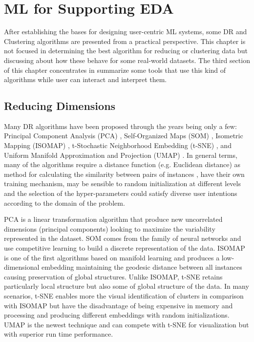 \chapter{ML for Supporting EDA}
\label{chapter3}

\graphicspath{{Chapter3/figs/}}

After establishing the bases for designing user-centric ML systems, some DR and Clustering algorithms are presented from a practical perspective. This chapter is not focused in determining the best algorithm for reducing or clustering data but discussing about how these behave for some real-world datasets. The third section of this chapter concentrates in summarize some tools that use this kind of algorithms while user can interact and interpret them.

\section{Reducing Dimensions}
\label{section3.1}

Many DR algorithms have been proposed through the years being only a few: Principal Component Analysis (PCA) \cite{PCA}, Self-Organized Maps (SOM) \cite{Kohonen1982Self-organizedMaps}, Isometric Mapping (ISOMAP) \cite{Tenenbaum2000},  t-Stochastic Neighborhood Embedding (t-SNE) \cite{VanDerMaaten2008}, and Uniform Manifold Approximation and Projection (UMAP) \cite{McInnes2018}. In general terms, many of the algorithms require a distance function (e.g. Euclidean distance) as method for calculating the similarity between pairs of instances \cite{Wenskovitch2018}, have their own training mechanism, may be sensible to random initialization at different levels and the selection of the hyper-parameters could satisfy diverse user intentions according to the domain of the problem.

PCA is a linear transformation algorithm that produce new uncorrelated dimensions (principal components) looking to maximize the variability represented in the dataset. SOM comes from the family of neural networks and use competitive learning to build a discrete representation of the data. ISOMAP is one of the first algorithms based on manifold learning and produces a low-dimensional embedding maintaining the geodesic distance between all instances causing preservation of global structures. Unlike ISOMAP, t-SNE retains particularly local structure but also some of global structure of the data. In many scenarios, t-SNE enables more the visual identification of clusters in comparison with ISOMAP but have the disadvantage of being expensive in  memory and processing and producing different embeddings with random initializations. UMAP is the newest technique and can compete with t-SNE for visualization but with superior run time performance.

